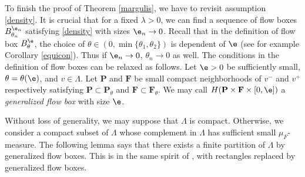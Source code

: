 \documentclass[11pt]{amsart}
\theoremstyle{definition}
\def\l{\lambda}   \def\L{\Lambda}
\def\t{\theta}
\def\bP{\textbf{P}}
\def\bF{\textbf{F}}
\begin{document}
To finish the proof of Theorem \ref{margulis}, we have to revisit assumption \eqref{density}. It is crucial that for a fixed $\l>0$, we can find a sequence of flow boxes $B_{\theta_n}^{\e_n}$ satisfying \eqref{density} with sizes $\e_n\to  0$. Recall that in the definition of flow box $B_\t^\e$, the choice of $\theta\in (0, \min\{\t_1,\t_2\})$ is dependent of $\e$ (see for example Corollary \ref{equicon}). Thus if $\e_n\to 0$, $\t_n\to 0$ as well. The conditions in the definition of flow boxes can be relaxed as follows. Let $\e>0$ be sufficiently small, $\t=\t(\e)$, and $v\in \L$. Let $\bP$ and $\bF$ be small compact neighborhoods of $v^-$ and $v^+$ respectively satisfying $\bP\subset \bP_{\theta}$ and $\bF\subset \bF_{\theta}$. We may call $H(\bP\times \bF\times [0,\e])$ a \emph{generalized flow box} with size $\e$.

 Without loss of generality, we may suppose that $\L$ is compact. Otherwise, we consider a compact subset of $\L$ whose complement in $\L$ has sufficient small $\mu_F$-measure.  The following lemma says that there exists a finite partition of $\L$ by generalized flow boxes. This is in the same spirit of \cite[Lemma 9.5.7]{BP}, with rectangles replaced by generalized flow boxes.
 
\end{document}
